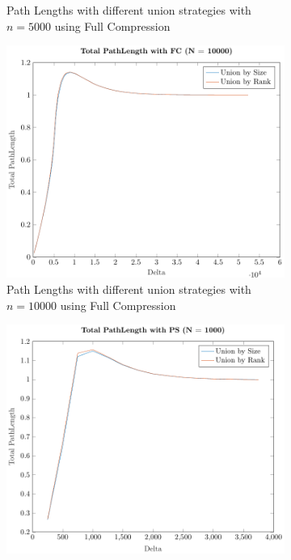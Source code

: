 \begin{figure}[ht]
\begin{subfigure}{0.32\textwidth}
        \caption{Path Lengths with different union strategies with $n = 5000$ using Full Compression}
    \end{subfigure}%
    \hfill
    \begin{subfigure}{0.32\textwidth}
        \centering
        \includegraphics[width=\textwidth]{../images/plotFCNonFull10000_PathLength.pdf}
        \caption{Path Lengths with different union strategies with $n = 10000$ using Full Compression}
    \end{subfigure}
    \begin{subfigure}{0.32\textwidth}
        \centering
        \includegraphics[width=\textwidth]{../images/plotPSNonFull1000_PathLength.pdf}

\end{subfigure}
\end{figure}
